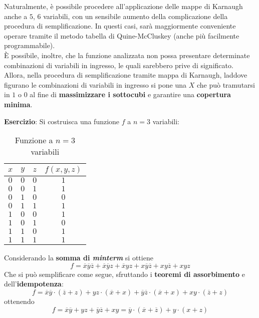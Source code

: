\documentclass[a4paper]{extarticle}
\begin{document}
Naturalmente, è possibile procedere all'applicazione delle mappe di Karnaugh anche a \(5\), \(6\) variabili, con un sensibile aumento della complicazione della procedura di semplificazione. In questi casi, sarà maggiormente conveniente operare tramite il metodo tabella di Quine-McCluskey (anche più facilmente programmabile).\\
È possibile, inoltre, che la funzione analizzata non possa presentare determinate combinazioni di variabili in ingresso, le quali sarebbero prive di significato. Allora, nella procedura di semplificazione tramite mappa di Karnaugh, laddove figurano le combinazioni di variabili in ingresso si pone una \(X\) che può tramutarsi in \(1\) o \(0\) al fine di \textbf{massimizzare i sottocubi} e garantire una \textbf{copertura minima}.

\vspace{1em}
\noindent
\textbf{Esercizio}: Si costruisca una funzione \(f\) a \(n = 3\) variabili:

\begin{table}[H]
    \centering
    \begin{tabular}{ccc|c}
         $x$ & $y$ & $z$ & $f(x, y, z)$\\
         \hline
         $0$ & $0$ & $0$ & $1$\\
         $0$ & $0$ & $1$ & $1$\\
         $0$ & $1$ & $0$ & $0$\\
         $0$ & $1$ & $1$ & $1$\\
         $1$ & $0$ & $0$ & $1$\\
         $1$ & $0$ & $1$ & $0$\\
         $1$ & $1$ & $0$ & $1$\\
         $1$ & $1$ & $1$ & $1$\\
    \end{tabular}
    \caption{Funzione a \(n = 3\) variabili}
    \label{tab:funzione_3_variabili_1}
\end{table}

\vspace{1em}
\noindent
Considerando la \textbf{somma di \textit{minterm}} si ottiene
\[f = \overline{x}\overline{y}\overline{z} + \overline{x}\overline{y}z + \overline{x}yz + x\overline{y}\overline{z} + xy\overline{z} + xyz\]
Che si può semplificare come segue, sfruttando i \textbf{teoremi di assorbimento} e dell'\textbf{idempotenza}:
\[f = \overline{x}\overline{y} \cdot (\overline{z} + z) + yz \cdot (\overline{x} + x) + \overline{y} \overline{z} \cdot (\overline{x} + x) + xy \cdot (\overline{z} + z)\]
ottenendo
\[f = \overline{x}\overline{y} + yz + \overline{y}\overline{z} + xy = \overline{y} \cdot (\overline{x} + \overline{z}) + y \cdot (x + z)\]
\end{document}
